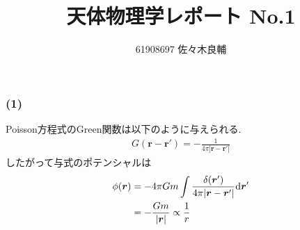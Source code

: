 \documentclass[uplatex,a4j,11pt,dvipdfmx]{jsarticle}
\begin{document}
\title{天体物理学レポート No.1}
\author{61908697 佐々木良輔}
\date{}
\maketitle
\subsubsection*{(1)}
Poisson方程式のGreen関数は以下のように与えられる.
\begin{align*}
  G({\bm r}-{\bm r'})=-\frac{1}{4\pi |{\bm r}-{\bm r'}|}
\end{align*}
したがって与式のポテンシャルは
\begin{align*}
  \phi({\bm r})&=-4\pi Gm\int\frac{\delta({\bm r'})}{4\pi|{\bm r}-{\bm r'}|}{\rm d}{\bm r'}\\
  &=-\frac{Gm}{|{\bm r}|}\propto \frac{1}{r}
\end{align*}
\end{document}
